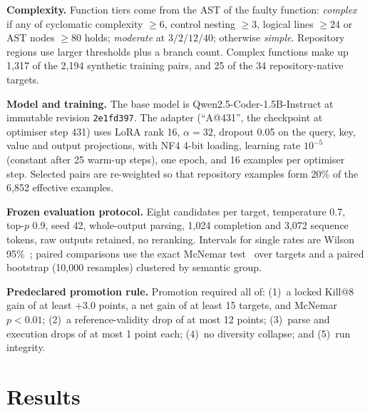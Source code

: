 \documentclass[conference,a4paper]{IEEEtran}
\makeatletter
\newcommand{\killk}[1]{Kill@#1}
\makeatother
\begin{document}
\textbf{Complexity.} Function tiers come from the AST of the faulty function:
\emph{complex} if any of cyclomatic complexity $\geq 6$, control nesting $\geq 3$,
logical lines $\geq 24$ or AST nodes $\geq 80$ holds; \emph{moderate} at
$3/2/12/40$; otherwise \emph{simple}. Repository regions use larger thresholds plus a
branch count. Complex functions make up 1,317 of the 2,194 synthetic training pairs,
and 25 of the 34 repository-native targets.

\textbf{Model and training.} The base model is Qwen2.5-Coder-1.5B-Instruct at
immutable revision \texttt{2e1fd397}. The adapter (``A@431'', the checkpoint at
optimiser step 431) uses LoRA rank 16, $\alpha=32$, dropout 0.05 on the query, key,
value and output projections, with NF4 4-bit loading, learning rate $10^{-5}$
(constant after 25 warm-up steps), one epoch, and 16 examples per optimiser step.
Selected pairs are re-weighted so that repository examples form 20\% of the 6,852
effective examples.

\textbf{Frozen evaluation protocol.} Eight candidates per target, temperature 0.7,
top-$p$ 0.9, seed 42, whole-output parsing, 1,024 completion and 3,072 sequence
tokens, raw outputs retained, no reranking. Intervals for single rates are Wilson
95\%~\cite{wilson1927probable}; paired comparisons use the exact McNemar
test~\cite{mcnemar1947note} over targets and a paired bootstrap (10,000 resamples)
clustered by semantic group.

\textbf{Predeclared promotion rule.} Promotion required all of: (1)~a locked
\killk{8} gain of at least $+3.0$ points, a net gain of at least 15 targets, and
McNemar $p<0.01$; (2)~a reference-validity drop of at most 12 points; (3)~parse and
execution drops of at most 1 point each; (4)~no diversity collapse; and (5)~run
integrity.

\section{Results}
\label{sec:results}
\end{document}
